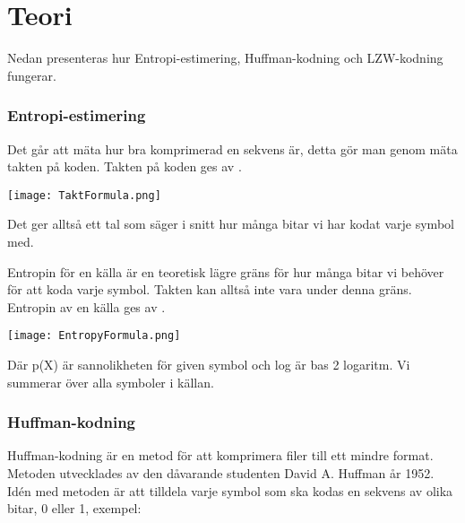 
\chapter{Teori}
\label{cha:theory}

Nedan presenteras hur Entropi-estimering, Huffman-kodning och LZW-kodning fungerar.

\subsection{Entropi-estimering}
Det går att mäta hur bra komprimerad en sekvens är, detta gör man genom mäta takten på koden. Takten på koden ges av \cite{nautsch2018}.

\bigskip
\noindent\texttt{[image: TaktFormula.png]}

\bigskip 
\noindent Det ger alltså ett tal som säger i snitt hur många bitar vi har kodat varje symbol med.

Entropin för en källa är en teoretisk lägre gräns för hur många bitar vi behöver för att koda varje symbol. Takten kan alltså inte vara under denna gräns. Entropin av en källa ges av \cite{nautsch2018}.

\bigskip 
\texttt{[image: EntropyFormula.png]}

\bigskip 
\noindent Där p(X) är sannolikheten för given symbol och log är bas 2 logaritm. Vi summerar över alla symboler i källan.


\subsection{Huffman-kodning}
Huffman-kodning är en metod för att komprimera filer till ett mindre format. Metoden utvecklades av  den dåvarande studenten David A. Huffman år 1952. Idén med metoden är att tilldela varje symbol som ska kodas en sekvens av olika bitar, 0 eller 1, exempel:

